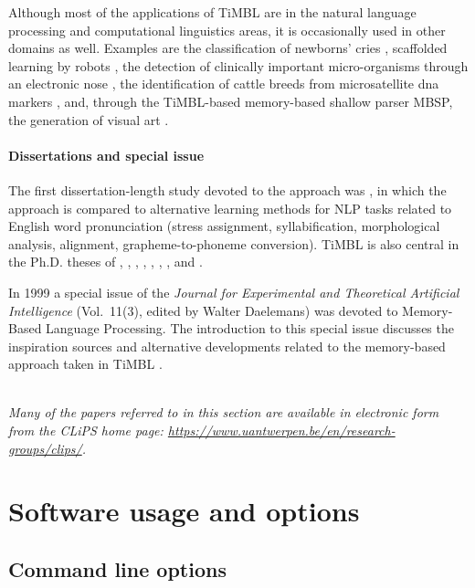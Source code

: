 \documentclass{book}
\begin{document}
Although most of the applications of TiMBL are in the natural language
processing and computational linguistics areas, it is occasionally
used in other domains as well. Examples are the classification of
newborns' cries \cite{Feier+14}, scaffolded learning by robots
\cite{Saunders+06}, the detection of clinically important
micro-organisms through an electronic nose \cite{Moens+06}, the
identification of cattle breeds from microsatellite {\sc dna} markers
\cite{Jaiswal+16}, and, through the TiMBL-based memory-based shallow
parser MBSP, the generation of visual art \cite{DeSmedt+11}.

\subsubsection{Dissertations and special issue}

The first dissertation-length study devoted to the approach was
\cite{VandenBosch97}, in which the approach is compared to alternative
learning methods for NLP tasks related to English word pronunciation
(stress assignment, syllabification, morphological analysis,
alignment, grapheme-to-phoneme conversion). TiMBL is also central in
the Ph.D. theses of , ,
, , ,
, , and
.

In 1999 a special issue of the {\em Journal for Experimental and
  Theoretical Artificial Intelligence} (Vol.~11(3), edited by Walter
Daelemans) was devoted to Memory-Based Language Processing. The
introduction to this special issue discusses the inspiration sources
and alternative developments related to the memory-based approach
taken in TiMBL \cite{Daelemans99b}.

\ \\

{\it Many of the papers referred to in this section are available in
electronic form from the {\sc CLiPS} home page:
\url{https://www.uantwerpen.be/en/research-groups/clips/}.}

\chapter{Software usage and options}
\label{reference}

\section{Command line options}
\label{commandline}
\end{document}
